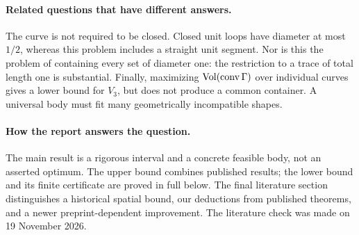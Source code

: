 \paragraph{Related questions that have different answers.}
The curve is not required to be closed. Closed unit loops have diameter at
most $1/2$, whereas this problem includes a straight unit segment.
Nor is this the problem of containing every set of diameter one:
the restriction to a trace of total length one is substantial.
Finally, maximizing $\operatorname{Vol}(\operatorname{conv}\Gamma)$ over individual curves gives a
lower bound for $V_3$, but does not produce a common container. A universal
body must fit many geometrically incompatible shapes.

\paragraph{How the report answers the question.}
The main result is a rigorous interval and a concrete feasible body,
not an asserted optimum. The upper bound combines published results;
the lower bound and its finite certificate are proved in full below.
The final literature section distinguishes a historical spatial bound,
our deductions from published theorems, and a newer preprint-dependent
improvement. The literature check was made on 19 November 2026.
